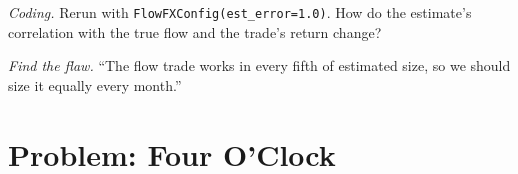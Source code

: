 \begin{exercise}[$\star\star\star$]\label{exo:s2:fx-flow-strategies:7}
\emph{Coding.} Rerun with \texttt{FlowFXConfig(est\_error=1.0)}. How do the estimate's correlation with the true flow and the trade's return change?
\end{exercise}

\begin{exercise}[$\star\star\star$]\label{exo:s2:fx-flow-strategies:8}
\emph{Find the flaw.} ``The flow trade works in every fifth of estimated size, so we should size it equally every month.''
\end{exercise}

\section{Problem: Four O'Clock}

